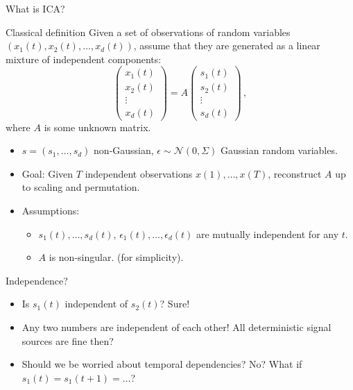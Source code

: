 \documentclass[final]{beamer} %
\newcommand{\eps}{\epsilon}
\begin{document}
\begin{frame}[c]
\begin{columns}[t,totalwidth=\textwidth]
\begin{column}{.32\textwidth}
\begin{block}{What is ICA?}
\begin{figure}
			\end{figure}
			\vspace{-0.5cm} 					
		\end{block}
		\vspace{0.5ex}

	
		\begin{block}{Classical definition}
		Given a set of observations of random variables
		$(x_1(t),x_2(t),\dots,x_d(t))$, 
		assume that they are generated as a linear mixture of \alert{independent components}:
		\[
		\begin{pmatrix}
		x_1(t)\\x_2(t)\\ \vdots \\ x_d(t)
		\end{pmatrix} = A
		\begin{pmatrix}
		s_1(t)\\s_2(t)\\ \vdots \\ s_d(t)
		\end{pmatrix}\,,
		\]
		where $A$ is some unknown matrix.
			\begin{itemize}
				\item $s = (s_1,\ldots, s_d)$ non-Gaussian, $\eps \sim \mathcal{N}(0,\Sigma)$ Gaussian random variables.
				\item Goal: Given $T$ independent observations $x(1), \ldots, x(T)$, reconstruct $A$ up to scaling and permutation.
				\item Assumptions:
                	\begin{itemize}
						\item $s_1(t),\ldots, s_d(t)$, $\eps_1(t), \ldots, \eps_d(t)$ are mutually independent for any $t$.
						\item $A$ is non-singular. (for simplicity). 
                     \end{itemize}				
			\end{itemize}
		\end{block}
		\vspace{0.5ex}
		\begin{block}{Independence?}
			\begin{itemize}
			\item Is $s_1(t)$ independent of $s_2(t)$? Sure!
			\item Any two numbers are independent of each other! 
			\alert{All deterministic signal sources are fine then?}
			\item Should we be worried about temporal dependencies? No? \alert{What if $s_1(t) = s_1(t+1) = \dots$?} 

\end{itemize}
\end{block}
\end{column}
\end{columns}
\end{frame}
\end{document}
